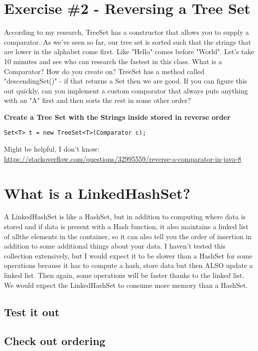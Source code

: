 \documentclass[12pt]{article}
\begin{document}
\section{Exercise \#2 - Reversing a Tree Set}
According to my research, TreeSet has a constructor that allows you to supply a comparator. As we've seen so far, our tree set is sorted such that the strings that are lower in the alphabet come first. Like "Hello" comes before "World". Let's take 10 minutes and see who can research the fastest in this class. What is a Comparator? How do you create on? TreeSet has a method called "descendingSet()" - if that returns a Set then we are good. If you can figure this out quickly, can you implement a custom comparator that always puts anything with an "A" first and then sorts the rest in some other order?

\textbf{Create a Tree Set with the Strings inside stored in reverse order}

\begin{lstlisting}
Set<T> t = new TreeSet<T>(Comparator c);
\end{lstlisting}

Might be helpful, I don't know:
\url{https://stackoverflow.com/questions/32995559/reverse-a-comparator-in-java-8}

\section{What is a LinkedHashSet?}
A LinkedHashSet is like a HashSet, but in addition to computing where data is stored and if data is present with a Hash function, it also maintains a linked list of allthe elements in the container, so it can also tell you the order of insertion in addition to some additional things about your data. I haven't tested this collection extensively, but I would expect it to be slower than a HashSet for some operations because it has to compute a hash, store data but then ALSO update a linked list. Then again, some operations will be faster thanks to the linked list. We would expect the LinkedHashSet to consume more memory than a HashSet.

\subsection{Test it out}

\subsection{Check out ordering}
\end{document}
